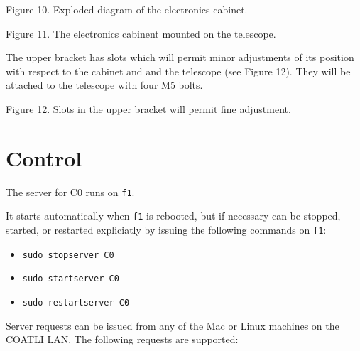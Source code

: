 Figure 10. Exploded diagram of the electronics cabinet.
 



Figure 11. The electronics cabinent mounted on the telescope.

The upper bracket has slots which will permit minor adjustments of its position with respect to the cabinet and and the telescope (see Figure 12). They will be attached to the telescope with four M5 bolts.





















Figure 12. Slots in the upper bracket will permit fine adjustment.

\section{Control}

The server for C0 runs on \verb|f1|. 

It starts automatically when \verb|f1| is rebooted, but if necessary can be stopped, started, or restarted expliciatly by issuing the following commands on \verb|f1|:
\begin{itemize}
\item
\verb|sudo stopserver C0|
\item
\verb|sudo startserver C0|
\item
\verb|sudo restartserver C0|
\end{itemize}

Server requests can be issued from any of the Mac or Linux machines on the COATLI LAN. The following requests are supported:

